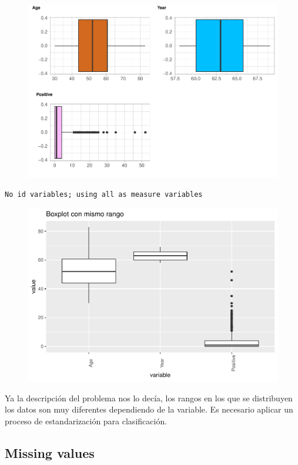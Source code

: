 \begin{figure}[H]\includegraphics[width=.9\linewidth]{img/EDA2_files/figure-latex/unnamed-chunk-11-4} \end{figure}

\begin{verbatim}
No id variables; using all as measure variables
\end{verbatim}

\begin{figure}[H]\includegraphics[width=.9\linewidth]{img/EDA2_files/figure-latex/unnamed-chunk-12-1} \end{figure}

Ya la descripción del problema nos lo decía, los rangos en los que se distribuyen los datos son muy diferentes dependiendo de la variable. Es necesario aplicar un proceso de estandarización para clasificación.

\subsection{Missing values}

